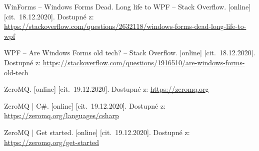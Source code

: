 \begin{flushleft}
\begin{thebibliography}{99}
 WinForms -- Windows Forms Dead. Long life to WPF -- Stack Overflow. [online] [cit.~18.12.2020]. Dostupné z: \url{https://stackoverflow.com/questions/2632118/windows-forms-dead-long-life-to-wpf}

 WPF -- Are Windows Forms old tech? -- Stack Overflow. [online] [cit.~18.12.2020]. Dostupné z: \url{https://stackoverflow.com/questions/1916510/are-windows-forms-old-tech}

 ZeroMQ. [online] [cit.~19.12.2020]. Dostupné z: \url{https://zeromq.org}

 ZeroMQ | C\#. [online] [cit.~19.12.2020]. Dostupné z: \url{https://zeromq.org/languages/csharp}

 ZeroMQ | Get started. [online] [cit.~19.12.2020]. Dostupné z: \url{https://zeromq.org/get-started}


\end{thebibliography}
\end{flushleft}
\newpage
